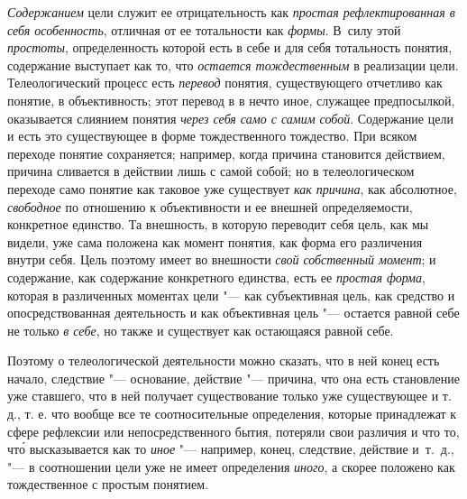 {{{\em Содержанием} цели
служит ее отрицательность как
{\em простая рефлектированная в себя
особенность}, отличная от ее тотальности как
{\em формы}. В~силу этой
{\em простоты},
определенность которой есть в себе и для себя тотальность
понятия, содержание выступает как то, что
{\em остается тождественным}
в реализации цели. Телеологический процесс есть
{\em перевод} понятия,
существующего отчетливо как понятие, в объективность; этот перевод в
в нечто иное, служащее предпосылкой, оказывается слиянием понятия
{\em через себя само с самим собой}.
Содержание цели и есть это существующее в форме
тождественного тождество. При всяком переходе понятие сохраняется;
например, когда причина становится действием, причина сливается в действии
лишь с самой собой; но в телеологическом переходе само понятие как таковое
уже существует {\em как причина},
как абсолютное,
{\em свободное} по
отношению к объективности и ее внешней определяемости, конкретное единство.
Та внешность, в которую переводит себя цель, как мы видели, уже сама
положена как момент понятия, как форма его различения внутри себя. Цель
поэтому имеет во внешности {\em свой
собственный момент}; и содержание, как содержание
конкретного единства, есть ее
{\em простая форма},
которая в различенных моментах цели "--- как
субъективная цель, как средство и опосредствованная деятельность и как
объективная цель "--- остается равной себе не только
{\em в себе}, но также и
существует как остающаяся равной себе.

Поэтому о телеологической деятельности можно сказать, что в
ней конец есть начало, следствие "--- основание, действие
"--- причина, что она есть становление уже ставшего, что в ней
получает существование только уже существующее и т. д., т. е. что вообще
все те соотносительные определения, которые принадлежат к сфере рефлексии
или непосредственного бытия, потеряли свои различия и что то, чт\'{о}
высказывается как то
{\em иное} "--- например,
конец, следствие, действие и~т.~д., "--- в соотношении цели уже
не имеет определения
{\em иного}, а скорее
положено как тождественное с простым понятием.

}}
